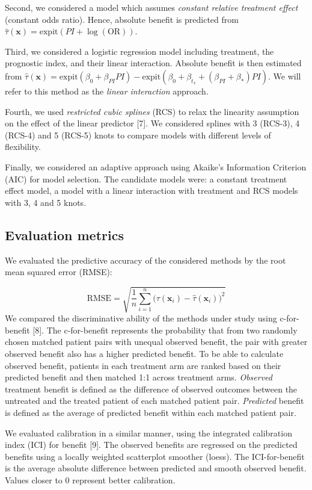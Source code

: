 \documentclass{article}
\begin{document}
Second, we considered a model which assumes \emph{constant relative
treatment effect} (constant odds ratio). Hence, absolute benefit is
predicted from
\(\hat{\tau}(\bm{x}) = \text{expit}(PI +\log(\text{OR}))\).

Third, we considered a logistic regression model including treatment,
the prognostic index, and their linear interaction. Absolute benefit is
then estimated from
\(\hat{\tau}(\bm{x})=\text{expit}(\beta_0+\beta_{PI}PI) - \text{expit}(\beta_0+\beta_{t_x}+(\beta_{PI}+\beta_*)PI)\).
We will refer to this method as the \emph{linear interaction} approach.

Fourth, we used \emph{restricted cubic splines} (RCS) to relax the
linearity assumption on the effect of the linear predictor {[}7{]}. We
considered splines with 3 (RCS-3), 4 (RCS-4) and 5 (RCS-5) knots to
compare models with different levels of flexibility.

Finally, we considered an adaptive approach using Akaike's Information
Criterion (AIC) for model selection. The candidate models were: a
constant treatment effect model, a model with a linear interaction with
treatment and RCS models with 3, 4 and 5 knots.

\hypertarget{evaluation-metrics}{%
\subsection{Evaluation metrics}\label{evaluation-metrics}}

We evaluated the predictive accuracy of the considered methods by the
root mean squared error (RMSE):

\[\text{RMSE}=\sqrt{\frac{1}{n}\sum_{i=1}^n\big(\tau(\bm{x}_i) - \hat{\tau}(\bm{x}_i)\big)^2}\]
We compared the discriminative ability of the methods under study using
c-for-benefit {[}8{]}. The c-for-benefit represents the probability that
from two randomly chosen matched patient pairs with unequal observed
benefit, the pair with greater observed benefit also has a higher
predicted benefit. To be able to calculate observed benefit, patients in
each treatment arm are ranked based on their predicted benefit and then
matched 1:1 across treatment arms. \emph{Observed} treatment benefit is
defined as the difference of observed outcomes between the untreated and
the treated patient of each matched patient pair. \emph{Predicted}
benefit is defined as the average of predicted benefit within each
matched patient pair.

We evaluated calibration in a similar manner, using the integrated
calibration index (ICI) for benefit {[}9{]}. The observed benefits are
regressed on the predicted benefits using a locally weighted scatterplot
smoother (loess). The ICI-for-benefit is the average absolute difference
between predicted and smooth observed benefit. Values closer to \(0\)
represent better calibration.
\end{document}

